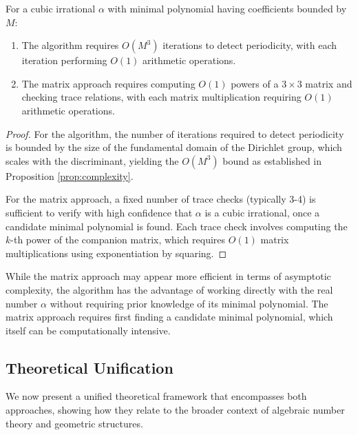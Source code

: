 \begin{proposition}\label{prop:complexity_comparison}
For a cubic irrational $\alpha$ with minimal polynomial having coefficients bounded by $M$:
\begin{enumerate}
    \item The \HAPD{} algorithm requires $O(M^3)$ iterations to detect periodicity, with each iteration performing $O(1)$ arithmetic operations.
    \item The matrix approach requires computing $O(1)$ powers of a $3 \times 3$ matrix and checking trace relations, with each matrix multiplication requiring $O(1)$ arithmetic operations.
\end{enumerate}
\end{proposition}

\begin{proof}
For the \HAPD{} algorithm, the number of iterations required to detect periodicity is bounded by the size of the fundamental domain of the Dirichlet group, which scales with the discriminant, yielding the $O(M^3)$ bound as established in Proposition \ref{prop:complexity}.

For the matrix approach, a fixed number of trace checks (typically 3-4) is sufficient to verify with high confidence that $\alpha$ is a cubic irrational, once a candidate minimal polynomial is found. Each trace check involves computing the $k$-th power of the companion matrix, which requires $O(1)$ matrix multiplications using exponentiation by squaring.
\end{proof}

\begin{remark}
While the matrix approach may appear more efficient in terms of asymptotic complexity, the \HAPD{} algorithm has the advantage of working directly with the real number $\alpha$ without requiring prior knowledge of its minimal polynomial. The matrix approach requires first finding a candidate minimal polynomial, which itself can be computationally intensive.
\end{remark}

\subsection{Theoretical Unification}

We now present a unified theoretical framework that encompasses both approaches, showing how they relate to the broader context of algebraic number theory and geometric structures.

